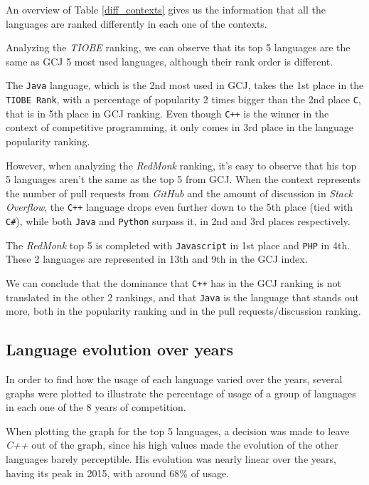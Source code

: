 \documentclass{article}
\begin{document}
\begin{multicols*}{2}
An overview of Table \ref{diff_contexts} gives us the information that all the languages are ranked differently in each one of the contexts.


Analyzing the \textit{TIOBE} ranking, we can observe that its top 5 languages are the same as GCJ 5 most used languages, although their rank order is different.

The \texttt{Java} language, which is the 2nd most used in GCJ, takes the 1st place in the \texttt{TIOBE Rank}, with a percentage of popularity 2 times bigger than the 2nd place \texttt{C}, that is in 5th place in GCJ ranking. Even though \texttt{C++} is the winner in the context of competitive programming, it only comes in 3rd place in the language popularity ranking.


However, when analyzing the \textit{RedMonk} ranking, it's easy to observe that his top 5 languages aren't the same as the top 5 from GCJ. When the context represents the number of pull requests from \textit{GitHub} and the amount of discussion in \textit{Stack Overflow}, the \texttt{C++} language drops even further down to the 5th place (tied with \texttt{C\#}), while both \texttt{Java} and \texttt{Python} surpass it, in 2nd and 3rd places respectively.

The \textit{RedMonk} top 5 is completed with \texttt{Javascript} in 1st place and \texttt{PHP} in 4th. These 2 languages are represented in 13th and 9th in the GCJ index.

We can conclude that the dominance that \texttt{C++} has in the GCJ ranking is not translated in the other 2 rankings, and that \texttt{Java} is the language that stands out more, both in the popularity ranking and in the pull requests/discussion ranking.


\subsection{Language evolution over years}

In order to find how the usage of each language varied over the years, several graphs were plotted to illustrate the percentage of usage of a group of languages in each one of the 8 years of competition.



When plotting the graph for the top 5 languages, a decision was made to leave \textit{C++} out of the graph, since his high values made the evolution of the other languages barely perceptible. His evolution was nearly linear over the years, having its peak in 2015, with around 68\% of usage.


\end{multicols*}
\end{document}
